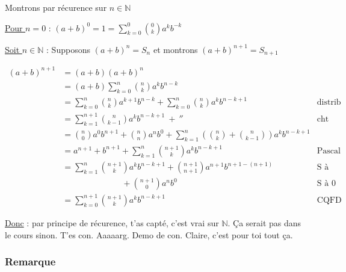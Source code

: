 \documentclass{report}
\newcommand{\N}{\mathbb{N}}
\begin{document}
          \begin{tcolorbox}[colback=white, colframe=black, boxrule=0.8pt, width=1\textwidth]

            Montrons par récurence sur $n\in\N$\vspace{1em}

            \underline{Pour $n=0$} : $(a+b)^0 = 1 = \sum_{k=0}^{0}\binom{0}{k} a^kb^{-k}$\vspace{1em}

            \underline{Soit $n\in\N$} : Supposons $(a+b)^n = S_n$ et montrons $(a+b)^{n+1} = S_{n+1}$

            
            \begin{align*}
              (a+b)^{n+1} &= (a+b)(a+b)^n &\\
                          &= (a+b)\sum_{k=0}^{n} \binom{n}{k} a^k b^{n-k}&\\
                          &= \sum_{k=0}^{n} \binom{n}{k} a^{k+1} b^{n-k} 
                          + \sum_{k=0}^{n} \binom{n}{k} a^k b^{n-k+1}&\text{distrib}\\
                          &= \sum_{k=1}^{n+1} \binom{n}{k-1} a^{k} b^{n-k+1} ~
                          + ~ '' &\text{cht ind}\\
                          &= \binom{n}{0} a^{0} b^{n+1} + \binom{n}{n} a^{n} b^{0} + \sum_{k=1}^{n} \left(\binom{n}{k}+\binom{n}{k-1}\right) a^{k} b^{n-k+1}\\
                          &= a^{n+1}+b^{n+1} + \sum_{k=1}^{n} \binom{n+1}{k} a^{k} b^{n-k+1}& \text{Pascal}\\
                          &= \sum_{k=1}^{n} \binom{n+1}{k} a^{k} b^{n-k+1} + \binom{n+1}{n+1} a^{n+1} b^{n+1-(n+1)} & \text{S à n+1}\\ &~~~~~~~~~~~~~~~~~~~~~~~~~~~~~~~~+ \binom{n+1}{0} a^{n} b^{0}& \text{S à 0}\\
                          &= \sum_{k=0}^{n+1} \binom{n+1}{k} a^{k} b^{n-k+1} & \text{CQFD}
            \end{align*}

            \underline{Donc} : par principe de récurence, t'as capté, c'est vrai sur $\N$. Ça serait pas dans le cours sinon. T'es con. Aaaaarg. Demo de con. Claire, c'est pour toi tout ça.
          \end{tcolorbox}

        \subsubsection{Remarque}
\end{document}
